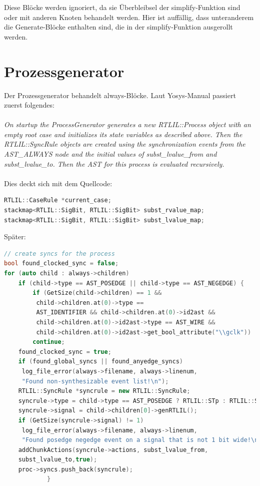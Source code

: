 \documentclass[11pt]{report}
\begin{document}
Diese Blöcke werden ignoriert, da sie Überbleibsel der simplify-Funktion sind oder mit anderen Knoten behandelt werden. Hier ist auffällig, dass unteranderem die Generate-Blöcke enthalten sind, die in der simplify-Funktion ausgerollt werden.

\section{Prozessgenerator}

Der Prozessgenerator behandelt always-Blöcke.
Laut Yosys-Manual passiert zuerst folgendes:
\\
\\
\textit{
On startup the ProcessGenerator generates a new RTLIL::Process object with an empty root case and initializes its state variables as described above. Then the RTLIL::SyncRule objects are created using the synchronization events from the AST\_ALWAYS node and the initial values of subst\_lvalue\_from and subst\_lvalue\_to. Then the AST for this process is evaluated recursively.
}
\\
\\
Dies deckt sich mit dem Quellcode:
\begin{lstlisting}[language=C++]
RTLIL::CaseRule *current_case;
stackmap<RTLIL::SigBit, RTLIL::SigBit> subst_rvalue_map;
stackmap<RTLIL::SigBit, RTLIL::SigBit> subst_lvalue_map;
\end{lstlisting}
Später:
\begin{lstlisting}[language=C++]
// create syncs for the process
bool found_clocked_sync = false;
for (auto child : always->children)
	if (child->type == AST_POSEDGE || child->type == AST_NEGEDGE) {
		if (GetSize(child->children) == 1 && 
		 child->children.at(0)->type == 
		 AST_IDENTIFIER && child->children.at(0)->id2ast &&
		 child->children.at(0)->id2ast->type == AST_WIRE && 
		 child->children.at(0)->id2ast->get_bool_attribute("\\gclk"))
		continue;
	found_clocked_sync = true;
	if (found_global_syncs || found_anyedge_syncs)
	 log_file_error(always->filename, always->linenum, 
	 "Found non-synthesizable event list!\n");
	RTLIL::SyncRule *syncrule = new RTLIL::SyncRule;
	syncrule->type = child->type == AST_POSEDGE ? RTLIL::STp : RTLIL::STn;
	syncrule->signal = child->children[0]->genRTLIL();
	if (GetSize(syncrule->signal) != 1)
	 log_file_error(always->filename, always->linenum, 
	 "Found posedge negedge event on a signal that is not 1 bit wide!\n");
	addChunkActions(syncrule->actions, subst_lvalue_from, 
	subst_lvalue_to,true);
	proc->syncs.push_back(syncrule);
			}
\end{lstlisting}
\end{document}
